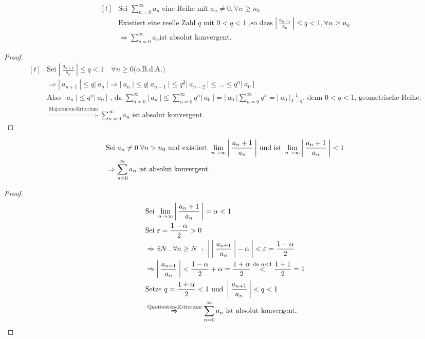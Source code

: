 \documentclass[a4paper,titlepage,oneside]{article}
\renewcommand{\epsilon}{\ensuremath{\varepsilon} }
\def\fa{\ensuremath{\forall}}
\def\sp{\hspace{0,1cm}}
\def\spdot{\sp.\sp}
\def\spcolon{\sp:\sp}
\newcommand{\suminf}[2][n]{\ensuremath{\sum_{#1= 0}^{\infty}{#2}}}
\renewcommand{\liminf}[2][n]{\ensuremath{\lim\limits_{#1 \rightarrow \infty}{#2}}}
\newcommand{\abs}[1]{\ensuremath{\left|\:#1\:\right|}}
\theoremstyle{thmstyle}
\begin{document}
\begin{subsatz}
\[\begin{aligned}[t]
&\text{Sei } \suminf{a_n} \text{ eine Reihe mit } a_n \ne 0 , \forall n \ge n_0 \\
&\text{Existiert eine reelle Zahl } q \text{ mit } 0 < q < 1 \text{ ,so dass } \abs{\frac{a_{n+1}}{a_n}} \le q < 1 , \forall n \ge n_0 \\
&\Rightarrow \suminf{a_n} \text{ist absolut konvergent.}
\end{aligned}\]

\begin{proof}
\[\begin{aligned}[t]
&\text{Sei } \abs{\frac{a_{n+1}}{a_n}} \le q < 1 \quad \forall n \ge 0 \text{(o.B.d.A.)} \\
&\Rightarrow \abs{a_{n+1}} \le q \abs{a_n} \Rightarrow \abs{a_n} \le q\abs{a_{n-1}} \le q^2 \abs{a_{n-2}} \le ... \le q^n \abs{a_0} \\
&\text{Also } \abs{a_n} \le q^n \abs{a_0} \text{ , da } \suminf{\abs{a_n}} \le \suminf{q^n \abs{a_0}} = \abs{a_0} \suminf{q^n} = \abs{a_0} \frac{1}{1-q} \text{, denn } 0 < q < 1\text{, geometrische Reihe.} \\
&\overset{\text{Majoranten-Kriterium}}{\Rightarrow} \suminf{a_n} \text{ ist absolut konvergent.}
\end{aligned}\]
\end{proof}
\end{subsatz}

\begin{subkorr}
\[\begin{aligned}[t]
&\text{Sei } a_n \ne 0 \sp \fa n > n_0 \text{ und existiert } \liminf{\abs{\frac{a_n+1}{a_n}}} \text{ und ist } \liminf{\abs{\frac{a_n+1}{a_n}}} < 1 \\
&\Rightarrow \suminf{a_n} \text{ ist absolut konvergent.}
\end{aligned}\]

\begin{proof}
\[\begin{aligned}[t]
&\text{Sei } \liminf{\abs{\frac{a_n+1}{a_n}}} = \alpha < 1 \\
&\text{Sei } \epsilon = \frac{1 - \alpha}{2} > 0 \\
&\Rightarrow \exists N \spdot \forall n \ge N \spcolon \abs{\abs{\frac{a_{n+1}}{a_n}} - \alpha} < \epsilon  = \frac{1-\alpha}{2} \\
&\Rightarrow \abs{\frac{a_{n+1}}{a_n}} < \frac{1-\alpha}{2} + \alpha = \frac{1+\alpha}{2} \overset{\text{da } \alpha < 1}{<} \frac{1+1}{2} = 1 \\
&\text{Setze } q = \frac{1 + \alpha}{2} < 1 \text{ und } \abs{\frac{a_{n+1}}{a_n}} < q < 1 \\
&\overset{\text{Quotienten-Kriterium}}{\Rightarrow}\suminf{a_n} \text{ ist absolut konvergent.}
\end{aligned}\]
\end{proof}
\end{subkorr}
\end{document}
